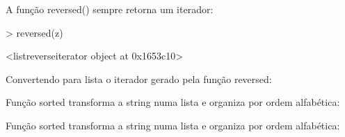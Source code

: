 \documentclass[letterpaper,10pt,brazil]{sphinxmanual}
\begin{document}
\begin{sphinxVerbatim}[commandchars=\\\{\}]
\end{sphinxVerbatim}

\begin{sphinxVerbatim}[commandchars=\\\{\}]
\end{sphinxVerbatim}

A função reversed() sempre retorna um iterador:

\textgreater{} reversed(z)

\textless{}listreverseiterator object at 0x1653c10\textgreater{}

Convertendo para lista o iterador gerado pela função reversed:

\begin{sphinxVerbatim}[commandchars=\\\{\}]
  
\end{sphinxVerbatim}

\begin{sphinxVerbatim}[commandchars=\\\{\}]
\end{sphinxVerbatim}

Função sorted transforma a string numa lista e organiza por ordem
alfabética:

\begin{sphinxVerbatim}[commandchars=\\\{\}]
\end{sphinxVerbatim}

\begin{sphinxVerbatim}[commandchars=\\\{\}]
\end{sphinxVerbatim}

Função sorted transforma a string numa lista e organiza por ordem alfabética:

\begin{sphinxVerbatim}[commandchars=\\\{\}]
 
\end{sphinxVerbatim}
\end{document}
